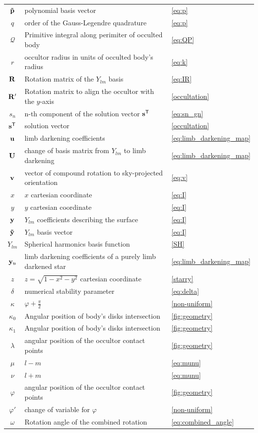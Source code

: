 \documentclass[modern]{aastex631}
\begin{document}
\begin{center}
\begin{longtable}{cll}
${\mathbf{\tilde p}}$ & polynomial basis vector &  \autoref{eq:p}\\
$q$ & order of the Gauss-Legendre quadrature &  \autoref{eq:p}\\
$\mathcal{Q}$ & Primitive integral along perimiter of occulted body & \autoref{eq:QP} \\
$r$ & occultor radius in units of occulted body's radius & \autoref{eq:k}\\
${\mathbf{R}}$ & Rotation matrix of the $Y_{lm}$ basis & \autoref{eq:IR} \\
${\mathbf{R'}}$ & Rotation matrix to align the occultor with the $y$-axis & \autoref{occultation} \\
$s_n$ & n-th component of the solution vector ${\mathbf{s}}^\mathsf{T}$  &\autoref{eq:sn_gn} \\
${\mathbf{s}}^\mathsf{T}$ & solution vector & \autoref{occultation} \\
${\mathbf{u}}$ & limb darkening coefficients &  \autoref{eq:limb_darkening_map}\\
${\mathbf{U}}$ & change of basis matrix from $Y_{lm}$ to limb darkening & \autoref{eq:limb_darkening_map} \\
${\mathbf{v}}$ & vector of compound rotation to sky-projected orientation &  \autoref{eq:v}\\
$x$ & $x$ cartesian coordinate &   \autoref{eq:I}\\
$y$ & $y$ cartesian coordinate &   \autoref{eq:I}\\
${\mathbf{y}}$ & $Y_{lm}$ coefficients describing the surface & \autoref{eq:I} \\
${\mathbf{\tilde y}}$ & $Y_{lm}$ basis vector &  \autoref{eq:I} \\
$Y_{lm}$ & Spherical harmonics basis function &  \autoref{SH}\\
${\mathbf{y}}_u$ & limb darkening coefficients of a purely limb darkened star & \autoref{eq:limb_darkening_map} \\
$z$ & $z=\sqrt{1 -x^2 -y^2}$ cartesian coordinate & \autoref{starry} \\
$\delta$ & numerical stability parameter &  \autoref{eq:delta}\\
$\kappa$ & $\varphi + \frac{\pi}{2}$ & \autoref{non-uniform} \\
$\kappa_0$ & Angular position of body's disks intersection & \autoref{fig:geometry} \\
$\kappa_1$ & Angular position of body's disks intersection &  \autoref{fig:geometry}\\
$\lambda$ & angular position of the occultor contact points & \autoref{fig:geometry} \\
$\mu$ & $l-m$ & \autoref{eq:munu} \\
$\nu$ & $l+m$ & \autoref{eq:munu} \\
$\varphi$ & angular position of the occultor contact points & \autoref{fig:geometry} \\
$\varphi '$ & change of variable for $\varphi$ & \autoref{non-uniform} \\
$\omega$        & Rotation angle of the combined rotation       & \autoref{eq:combined_angle} \\
%
\end{longtable}
\end{center}
\end{document}
